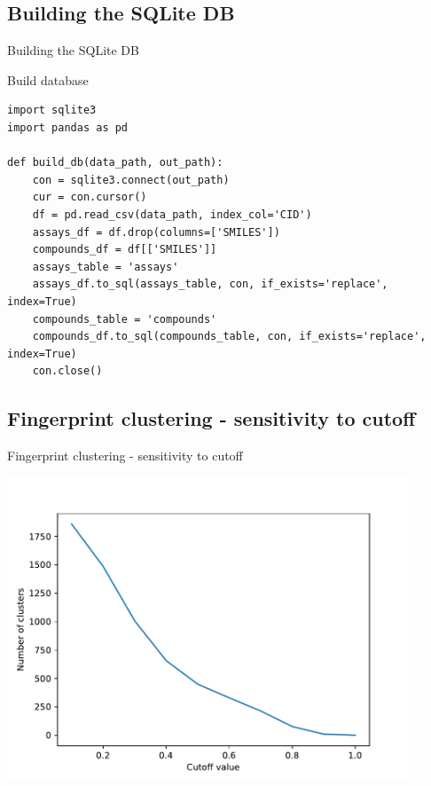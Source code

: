 \documentclass{beamer}
\begin{document}
\subsection{Building the SQLite DB}
\begin{frame}[fragile]{Building the SQLite DB}

\begin{block}{Build database}
\begin{lstlisting}[firstnumber=1, label=glabels, xleftmargin=10pt] 
import sqlite3
import pandas as pd

def build_db(data_path, out_path):
    con = sqlite3.connect(out_path)
    cur = con.cursor()
    df = pd.read_csv(data_path, index_col='CID')
    assays_df = df.drop(columns=['SMILES'])
    compounds_df = df[['SMILES']]
    assays_table = 'assays'
    assays_df.to_sql(assays_table, con, if_exists='replace', index=True)
    compounds_table = 'compounds'
    compounds_df.to_sql(compounds_table, con, if_exists='replace', index=True)
    con.close()

\end{lstlisting}
\end{block}
    
\end{frame}
    

\subsection{Fingerprint clustering - sensitivity to cutoff}
\begin{frame}{Fingerprint clustering - sensitivity to cutoff}

\includegraphics[width=0.9\textwidth]{../outputs/fingerprint_cluster_cutoffs.pdf}
    
\end{frame}
    
\end{document}
